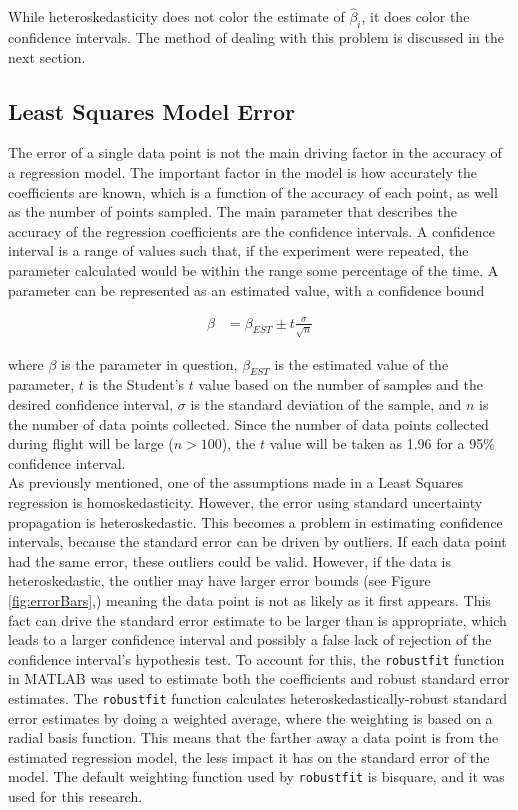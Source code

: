 While heteroskedasticity does not color the estimate of $\hat{\beta}_i$, it does color the confidence intervals. The method of dealing with this problem is discussed in the next section.


\subsection*{Least Squares Model Error}
The error of a single data point is not the main driving factor in the accuracy of a regression model. The important factor in the model is how accurately the coefficients are known, which is a function of the accuracy of each point, as well as the number of points sampled. The main parameter that describes the accuracy of the regression coefficients are the confidence intervals. A confidence interval is a range of values such that, if the experiment were repeated, the parameter calculated would be within the range some percentage of the time. A parameter can be represented as an estimated value, with a confidence bound

\begin{align}
\label{confidenceInterval}
\beta &= \beta_{EST} \pm t\frac{\sigma}{\sqrt{n}}
\end{align}

where $\beta$ is the parameter in question, $\beta_{EST}$ is the estimated value of the parameter, $t$ is the Student's $t$ value based on the number of samples and the desired confidence interval, $\sigma$ is the standard deviation of the sample, and $n$ is the number of data points collected. Since the number of data points collected during flight will be large ($n>100$), the $t$ value will be taken as 1.96 for a 95\% confidence interval.\\
As previously mentioned, one of the assumptions made in a Least Squares regression is homoskedasticity. However, the error using standard uncertainty propagation is heteroskedastic. This becomes a problem in estimating confidence intervals, because the standard error can be driven by outliers. If each data point had the same error, these outliers could be valid. However, if the data is heteroskedastic, the outlier may have larger error bounds (see Figure \ref{fig:errorBars},) meaning the data point is not as likely as it first appears. This fact can drive the standard error estimate to be larger than is appropriate, which leads to a larger confidence interval and possibly a false lack of rejection of the confidence interval's hypothesis test. To account for this, the \texttt{robustfit} function in MATLAB  was used to estimate both the coefficients and robust standard error estimates. The \texttt{robustfit} function calculates heteroskedastically-robust standard error estimates by doing a weighted average, where the weighting is based on a radial basis function. This means that the farther away a data point is from the estimated regression model, the less impact it has on the standard error of the model. The default weighting function used by \texttt{robustfit} is bisquare, and it was used for this research.

